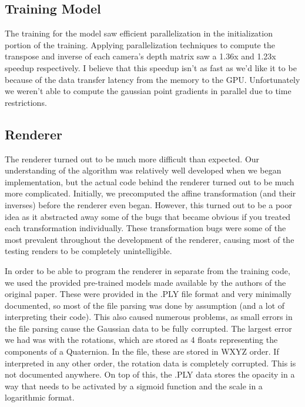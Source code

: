 \documentclass[12pt, a4paper, twocolumn]{article}
\begin{document}
\subsection{Training Model}

The training for the model saw efficient parallelization in the initialization portion of the training. Applying parallelization techniques to compute the transpose and inverse of each camera's depth matrix saw a 1.36x and 1.23x speedup respectively. I believe that this speedup isn't as fast as we'd like it to be because of the data transfer latency from the memory to the GPU. Unfortunately we weren't able to compute the gaussian point gradients in parallel due to time restrictions.

\subsection{Renderer}

The renderer turned out to be much more difficult than expected. Our understanding of the algorithm was relatively well developed when we began implementation, but the actual code behind the renderer turned out to be much more complicated. Initially, we precomputed the affine transformation (and their inverses) before the renderer even began. However, this turned out to be a poor idea as it abstracted away some of the bugs that became obvious if you treated each transformation individually. These transformation bugs were some of the most prevalent throughout the development of the renderer, causing most of the testing renders to be completely unintelligible. 

In order to be able to program the renderer in separate from the training code, we used the provided pre-trained models made available by the authors of the original paper. These were provided in the .PLY file format and very minimally documented, so most of the file parsing was done by assumption (and a lot of interpreting their code). This also caused numerous problems, as small errors in the file parsing cause the Gaussian data to be fully corrupted. The largest error we had was with the rotations, which are stored as 4 floats representing the components of a Quaternion. In the file, these are stored in WXYZ order. If interpreted in any other order, the rotation data is completely corrupted. This is not documented anywhere. On top of this, the .PLY data stores the opacity in a way that needs to be activated by a sigmoid function and the scale in a logarithmic format. 
\end{document}
